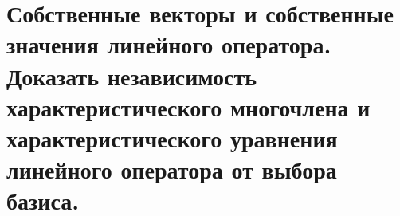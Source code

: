 \section{
    Собственные векторы и собственные значения линейного оператора. Доказать независимость характеристического многочлена и характеристического уравнения линейного оператора от выбора базиса.
}
